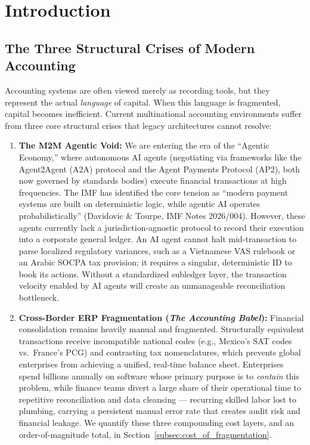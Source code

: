 \section{Introduction}

\subsection{The Three Structural Crises of Modern Accounting}
\label{subsec:crises}
Accounting systems are often viewed merely as recording tools, but they represent the actual \textit{language} of capital. When this language is fragmented, capital becomes inefficient. Current multinational accounting environments suffer from three core structural crises that legacy architectures cannot resolve:

\begin{enumerate}
    \item \textbf{The M2M Agentic Void:} We are entering the era of the ``Agentic Economy,'' where autonomous AI agents (negotiating via frameworks like the Agent2Agent (A2A) protocol and the Agent Payments Protocol (AP2), both now governed by standards bodies) execute financial transactions at high frequencies. The IMF has identified the core tension as ``modern payment systems are built on deterministic logic, while agentic AI operates probabilistically'' (Davidovic \& Tourpe, IMF Notes 2026/004). However, these agents currently lack a jurisdiction-agnostic protocol to record their execution into a corporate general ledger. An AI agent cannot halt mid-transaction to parse localized regulatory variances, such as a Vietnamese VAS rulebook or an Arabic SOCPA tax provision; it requires a singular, deterministic ID to book its actions. Without a standardized subledger layer, the transaction velocity enabled by AI agents will create an unmanageable reconciliation bottleneck.
    \item \textbf{Cross-Border ERP Fragmentation (\textit{The Accounting Babel}):} Financial consolidation remains heavily manual and fragmented. Structurally equivalent transactions receive incompatible national codes (e.g., Mexico's SAT codes vs.\ France's PCG) and contrasting tax nomenclatures, which prevents global enterprises from achieving a unified, real-time balance sheet. Enterprises spend billions annually on software whose primary purpose is to \emph{contain} this problem, while finance teams divert a large share of their operational time to repetitive reconciliation and data cleansing --- recurring skilled labor lost to plumbing, carrying a persistent manual error rate that creates audit risk and financial leakage. We quantify these three compounding cost layers, and an order-of-magnitude total, in Section~\ref{subsec:cost_of_fragmentation}.

\end{enumerate}
